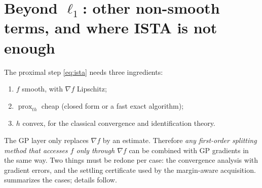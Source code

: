 \documentclass[10pt]{article}
\newcommand{\prox}{\operatorname{prox}}
\theoremstyle{remark}
\begin{document}
\section{Beyond $\ell_1$: other non-smooth terms, and where ISTA is not enough}\label{sec:ext}

The proximal step \eqref{eq:ista} needs three ingredients:
\begin{enumerate}[label=(R\arabic*)]
\item $f$ smooth, with $\nabla f$ Lipschitz;
\item $\prox_{th}$ cheap (closed form or a fast exact algorithm);
\item $h$ convex, for the classical convergence and identification theory.
\end{enumerate}
The GP layer only replaces $\nabla f$ by an estimate. Therefore \emph{any first-order splitting method that accesses $f$ only through $\nabla f$}
can be combined with GP gradients in the same way. Two things must be redone per case: the convergence analysis with gradient errors, and the
settling certificate used by the margin-aware acquisition.  summarizes the cases; details follow.
\end{document}
